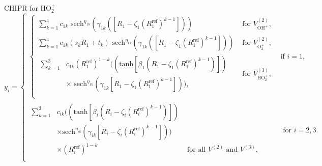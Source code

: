 \documentclass{beamer}
\newcommand\Fontvi{\fontsize{8}{7.2}\selectfont} %
\def\D{\displaystyle}
\begin{document}
\begin{frame}{CHIPR for HO$_2^+$}
    \Fontvi
    \begin{equation}
        y_i =
        \begin{cases}
            \begin{cases}
                \D\sum_{k=1}^4 c_{1k}\text{ sech}^{\eta_{1k}}(\gamma_{1k}(\left[R_1 - \zeta_1(R_1^{\text{ref}})^{k-1}\right])) & \text{ for } V^{(2)}_{\text{OH}^+},\\
                \D\sum_{k=1}^4 c_{1k}(s_kR_1 + t_k)\text{ sech}^{\eta_{1k}}(\gamma_{1k}(\left[R_1 - \zeta_1(R_1^{\text{ref}})^{k-1}\right])) & \text{ for } V^{(2)}_{\text{O}_2^+}, \\
                \begin{split}
                    \D\sum_{k=1}^3 &c_{1k}(R_1^{\text{ref}})^{1-k}((\text{tanh}\left[\beta_1(R_1 - \zeta_1(R_1^\text{ref})^{k-1})\right]) \\ &\times \text{ sech}^{\eta_{1k}}(\gamma_{1k}\left[R_1 - \zeta_1(R_1^{\text{ref}})^{k-1}\right])), 
                \end{split}
                & \text{ for } V^{(3)}_{\text{HO}_2^+}, \\
            \end{cases}
            & \text{if }i=1, \\
                \begin{split}
                    \D\sum_{k=1}^3 &c_{ik}((\text{tanh}\left[\beta_i(R_i - \zeta_i(R_i^\text{ref})^{k-1})\right]) \\ & \times \text{sech}^{\eta_{ik}}(\gamma_{ik}\left[R_i - \zeta_i(R_i^{\text{ref}})^{k-1}\right])) \\ & \times {(R_i^{\text{ref}})^{1-k}}
                    & \text{ for all }V^{(2)} \text{ and } V^{(3)}, \\
                \end{split}
            & \text{ for } i=2,3.
            \end{cases}
        \label{eq:chipry}
    \end{equation}
\end{frame}
\end{document}
